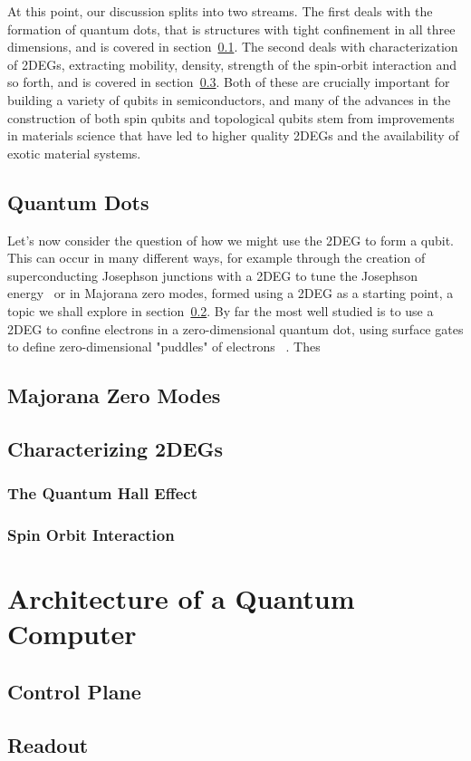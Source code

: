 At this point, our discussion splits into two streams.
The first deals with the formation of quantum dots, that is structures with tight confinement in all three dimensions,
and is covered in section~\ref{sec:qd}.
The second deals with characterization of 2DEGs, extracting
mobility, density, strength of the spin-orbit interaction and so forth, and is covered in section~\ref{sec:char}.
Both of these are crucially important for building a variety of qubits in semiconductors,
and many of the advances in the construction of both spin qubits and topological qubits stem from improvements in
materials science that have led to higher quality 2DEGs and the availability of exotic material systems.

\subsection{Quantum Dots}
\label{sec:qd}
Let's now consider the question of how we might use the 2DEG to form a qubit. This can occur in many different
ways, for example through the creation of superconducting Josephson junctions with a 2DEG to tune the Josephson
energy~\cite{karl-gatemon} or in Majorana zero modes\cite{PhysRevLett.119.136803}, formed using a 2DEG as a starting
point, a topic we shall explore in section~\ref{sec:majo}. By far the most well studied is to use a 2DEG to confine
electrons in a zero-dimensional quantum dot, using surface gates to define zero-dimensional "puddles" of electrons
~\cite{RevModPhys.79.1217,RevModPhys.75.1}.
Thes


\subsection{Majorana Zero Modes}
\label{sec:majo}


\subsection{Characterizing 2DEGs}
\label{sec:char}
\subsubsection{The Quantum Hall Effect}
\subsubsection{Spin Orbit Interaction}

\section{Architecture of a Quantum Computer}
\label{sec:arch}
  \subsection{Control Plane}
  \subsection{Readout}